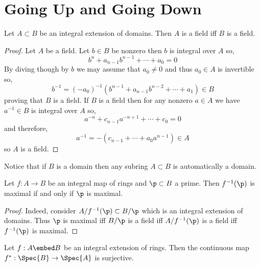 \documentclass[12pt]{article}
\begin{document}
\section{Going Up and Going Down}

\begin{lemma}
Let $A \subset B$ be an integral extension of domains. Then $A$ is a field iff $B$ is a field.
\end{lemma}


\begin{proof}
Let $A$ be a field. Let $b \in B$ be nonzero then $b$ is integral over $A$ so,
\[ b^n + a_{n-1} b^{n-1} + \cdots + a_0 = 0 \]
By diving though by $b$ we may assume that $a_0 \neq 0$ and thus $a_0 \in A$ is invertible so,
\[ b^{-1} = (-a_0)^{-1} (b^{n-1} + a_{n-1} b^{n-2} + \cdots + a_1) \in B \]
proving that $B$ is a field. If $B$ is a field then for any nonzero $a \in A$ we have $a^{-1} \in B$ is integral over $A$ so,
\[ a^{-n} + c_{n-1} a^{-n+1} + \cdots + c_0 = 0 \]
and therefore,
\[ a^{-1} = -(c_{n-1} + \cdots + a_0 a^{n-1}) \in A \]
so $A$ is a field.
\end{proof}

\begin{rmk}
Notice that if $B$ is a domain then any subring $A \subset B$ is automatically a domain. 
\end{rmk}

\begin{lemma}
Let $f : A \to B$ be an integral map of rings and $\p \subset B$ a prime. Then $f^{-1}(\p)$ is maximal if and only if $\p$ is maximal.
\end{lemma}

\begin{proof}
Indeed, consider $A / f^{-1}(\p) \subset B / \p$ which is an integral extension of domains. Thus $\p$ is maximal iff $B / \p$ is a field iff $A / f^{-1}(\p)$ is a field iff $f^{-1}(\p)$ is maximal.
\end{proof}

\begin{prop}
Let $f : A \embed B$ be an integral extension of rings. Then the continuous map $f^* : \Spec{B} \to \Spec{A}$ is surjective.
\end{prop}
\end{document}
